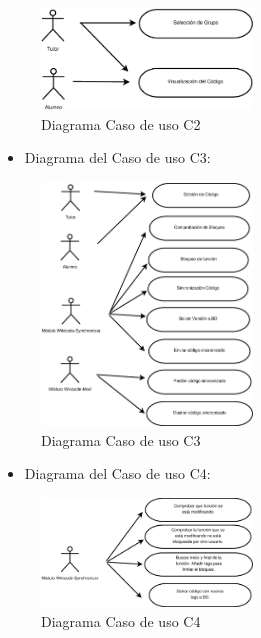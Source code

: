 \begin{figure}[h]
	\centering
	\includegraphics[width=0.5\textwidth]{./img/c3-cu2.eps}
	\caption{Diagrama Caso de uso C2}
\end{figure}

\begin{itemize}
	\item Diagrama del Caso de uso C3:
\end{itemize}

\begin{figure}[h]
	\centering
	\includegraphics[width=0.5\textwidth]{./img/c3-cu3.eps}
	\caption{Diagrama Caso de uso C3}
\end{figure}

\newpage

\begin{itemize}
	\item Diagrama del Caso de uso C4:
\end{itemize}

\begin{figure}[h]
	\centering
	\includegraphics[width=0.5\textwidth]{./img/c3-cu4.eps}
	\caption{Diagrama Caso de uso C4}
\end{figure}

